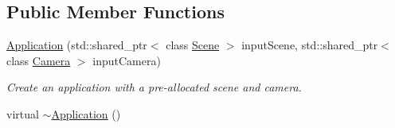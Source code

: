 \subsection*{Public Member Functions}
\begin{DoxyCompactItemize}
\item 
\hyperlink{class_application_a78cdcb03e6f06272f7c528fe407951c5}{Application} (std\+::shared\+\_\+ptr$<$ class \hyperlink{class_scene}{Scene} $>$ input\+Scene, std\+::shared\+\_\+ptr$<$ class \hyperlink{class_camera}{Camera} $>$ input\+Camera)
\begin{DoxyCompactList}\small\item\em Create an application with a pre-\/allocated scene and camera. \end{DoxyCompactList}\item 
\hypertarget{class_application_a748bca84fefb9c12661cfaa2f623748d}{}virtual \hyperlink{class_application_a748bca84fefb9c12661cfaa2f623748d}{$\sim$\+Application} ()\label{class_application_a748bca84fefb9c12661cfaa2f623748d}


\end{DoxyCompactItemize}

